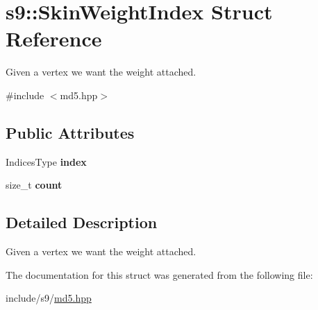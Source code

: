 \hypertarget{structs9_1_1SkinWeightIndex}{\section{s9\-:\-:Skin\-Weight\-Index Struct Reference}
\label{structs9_1_1SkinWeightIndex}
}


Given a vertex we want the weight attached.  




{\ttfamily \#include $<$md5.\-hpp$>$}

\subsection*{Public Attributes}
\begin{DoxyCompactItemize}
\item 
\hypertarget{structs9_1_1SkinWeightIndex_a26c7514b440464f4cf557759a9ee60fb}{Indices\-Type {\bfseries index}}\label{structs9_1_1SkinWeightIndex_a26c7514b440464f4cf557759a9ee60fb}

\item 
\hypertarget{structs9_1_1SkinWeightIndex_a3bcbe21d985c0e1ccff686bf755c198e}{size\-\_\-t {\bfseries count}}\label{structs9_1_1SkinWeightIndex_a3bcbe21d985c0e1ccff686bf755c198e}

\end{DoxyCompactItemize}


\subsection{Detailed Description}
Given a vertex we want the weight attached. 

The documentation for this struct was generated from the following file\-:\begin{DoxyCompactItemize}
\item 
include/s9/\hyperlink{md5_8hpp}{md5.\-hpp}\end{DoxyCompactItemize}

